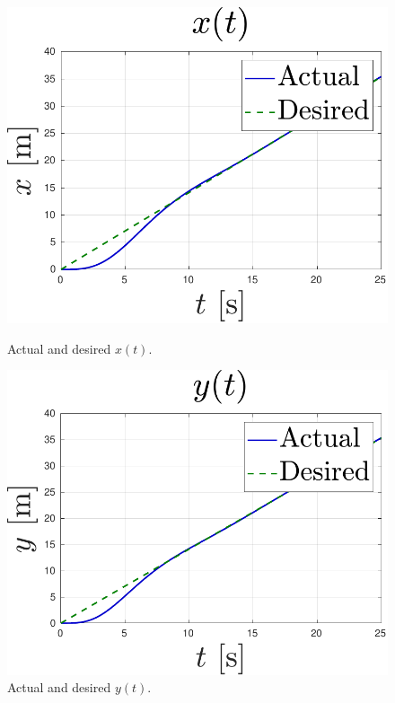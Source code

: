 \begin{figure}
    \centering
    \begin{minipage}[b]{0.45\textwidth}
        \centering
        \includegraphics[width=\textwidth]{images/pid_x.pdf}
        \caption[Tracking in X-axis]{Actual and desired $x(t)$.}
        \label{fig:pid_x}
    \end{minipage}
    \begin{minipage}[b]{0.45\textwidth}
        \centering
        \includegraphics[width=\textwidth]{images/pid_y.pdf}
        \caption[Tracking in Y-axis]{Actual and desired $y(t)$.}

\end{minipage}
\end{figure}
